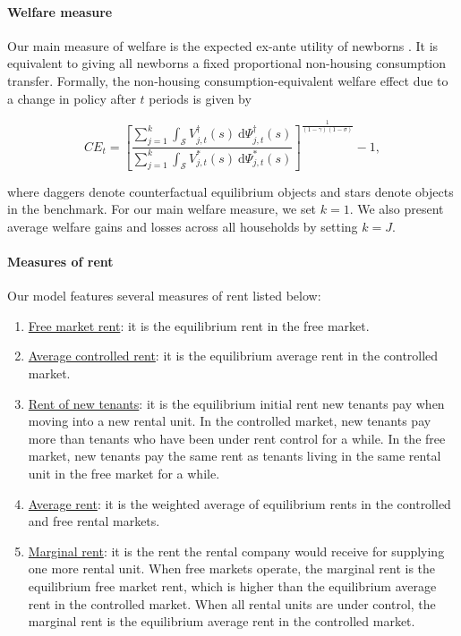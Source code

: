 \documentclass[parskip=full]{article}
\begin{document}
\paragraph{Welfare measure} Our main measure of welfare is the expected ex-ante utility of newborns \citep{ralws-1971,conesa-et-al,gkkoc}. It is equivalent to giving all newborns a fixed proportional non-housing consumption transfer. Formally, the non-housing consumption-equivalent welfare effect due to a change in policy after $t$ periods is given by

\begin{equation*}
  CE_{t} = \left[\frac{\sum_{j=1}^{k}\int_{\mathcal{S}}V^{\dagger}_{j,t}(s)\ \mathrm{d}\Psi^{\dagger}_{j,t}(s)}{\sum_{j=1}^{k}\int_{\mathcal{S}}V^*_{j,t}(s)\ \mathrm{d}\Psi^*_{j,t}(s)}\right]^{\frac{1}{(1-\gamma)(1-\sigma)}}-1,
\end{equation*}

\noindent where daggers denote counterfactual equilibrium objects and stars denote objects in the benchmark. For our main welfare measure, we set $k=1$. We also present average welfare gains and losses across all households by setting $k=J$.

\paragraph{Measures of rent} Our model features several measures of rent listed below: 

\begin{enumerate}
    \item \underline{Free market rent}: it is the equilibrium rent in the free market.
    \item \underline{Average controlled rent}: it is the equilibrium average rent in the controlled market.
    \item \underline{Rent of new tenants}: it is the equilibrium initial rent new tenants pay when moving into a new rental unit. In the controlled market, new tenants pay more than tenants who have been under rent control for a while. In the free market, new tenants pay the same rent as tenants living in the same rental unit in the free market for a while.
    \item \underline{Average rent}: it is the weighted average of equilibrium rents in the controlled and free rental markets.
    \item \underline{Marginal rent}: it is the rent the rental company would receive for supplying one more rental unit. When free markets operate, the marginal rent is the equilibrium free market rent, which is higher than the equilibrium average rent in the controlled market. When all rental units are under control, the marginal rent is the equilibrium average rent in the controlled market.
\end{enumerate}
\end{document}

